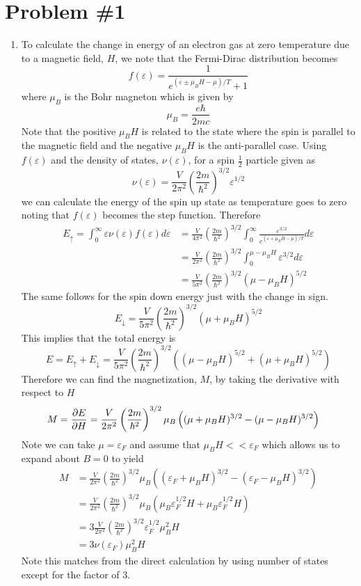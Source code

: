 \documentclass[11pt]{article}
\numberwithin{equation}{section}
\begin{document}



\section{Problem \#1}
\begin{enumerate}[(1)]
\item To calculate the change in energy of an electron gas at zero temperature due to a 
magnetic field, $H$, we note that the Fermi-Dirac distribution becomes
$$f(\varepsilon) = \frac{1}{e^{(\varepsilon\pm\mu_BH-\mu)/T}+1}$$
where $\mu_B$ is the Bohr magneton which is given by
$$\mu_B = \frac{e\hbar}{2mc}$$
Note that the positive $\mu_BH$ is related to the state where the spin is parallel to the
magnetic field and the negative $\mu_BH$ is the anti-parallel case.  Using $f(\varepsilon)$ 
and the density of states, $\nu(\varepsilon)$, for a spin $\frac{1}{2}$ particle given as
$$\nu(\varepsilon) = \frac{V}{2\pi^2}\left(\frac{2m}{\hbar^2}\right)^{3/2}\varepsilon^{1/2}$$
we can calculate the energy of the spin up state as temperature goes to zero noting that
$f(\varepsilon)$ becomes the step function. Therefore
\begin{align*}
E_{\uparrow} = \int_{0}^{\infty}\varepsilon\nu(\varepsilon)f(\varepsilon)d\varepsilon &= \frac{V}{4\pi^2}\left(\frac{2m}{\hbar^2}\right)^{3/2}\int_{0}^{\infty}\frac{\varepsilon^{3/2}}{e^{(\varepsilon+\mu_BH-\mu)/T}}d\varepsilon\\
&= \frac{V}{2\pi^2}\left(\frac{2m}{\hbar^2}\right)^{3/2}\int_{0}^{\mu-\mu_BH}\varepsilon^{3/2}d\varepsilon\\
&= \frac{V}{5\pi^2}\left(\frac{2m}{\hbar^2}\right)^{3/2}(\mu-\mu_BH)^{5/2}
\end{align*}
The same follows for the spin down energy just with the change in sign.
$$E_{\downarrow} = \frac{V}{5\pi^2}\left(\frac{2m}{\hbar^2}\right)^{3/2}(\mu+\mu_BH)^{5/2}$$
This implies that the total energy is
$$E = E_{\uparrow} + E_{\downarrow} = \frac{V}{5\pi^2}\left(\frac{2m}{\hbar^2}\right)^{3/2}\left((\mu-\mu_BH)^{5/2} + (\mu+\mu_BH)^{5/2}\right)$$
Therefore we can find the magnetization, $M$, by taking the derivative with respect to $H$
\begin{align*}
M &= \frac{\partial{E}}{\partial{H}} = \frac{V}{2\pi^2}\left(\frac{2m}{\hbar^2}\right)^{3/2}\mu_B\left((\mu+\mu_BH)^{3/2} - (\mu-\mu_BH)^{3/2}\right)
\end{align*}
Note we can take $\mu=\varepsilon_F$ and assume that $\mu_BH<<\varepsilon_F$ which allows us
to expand about $B=0$ to yield
\begin{align*}
M &= \frac{V}{2\pi^2}\left(\frac{2m}{\hbar^2}\right)^{3/2}\mu_B\left((\varepsilon_F+\mu_BH)^{3/2} - (\varepsilon_F-\mu_BH)^{3/2}\right)\\
&= \frac{V}{2\pi^2}\left(\frac{2m}{\hbar^2}\right)^{3/2}\mu_B\left(\mu_B\varepsilon_F^{1/2}H + \mu_B\varepsilon_F^{1/2}H\right)\\
&= 3\frac{V}{2\pi^2}\left(\frac{2m}{\hbar^2}\right)^{3/2}\varepsilon_F^{1/2}\mu_B^2H\\
&= 3\nu(\varepsilon_F)\mu_B^2H
\end{align*}
Note this matches from the direct calculation by using number of states except for the factor
of 3.


\end{enumerate}
\end{document}
